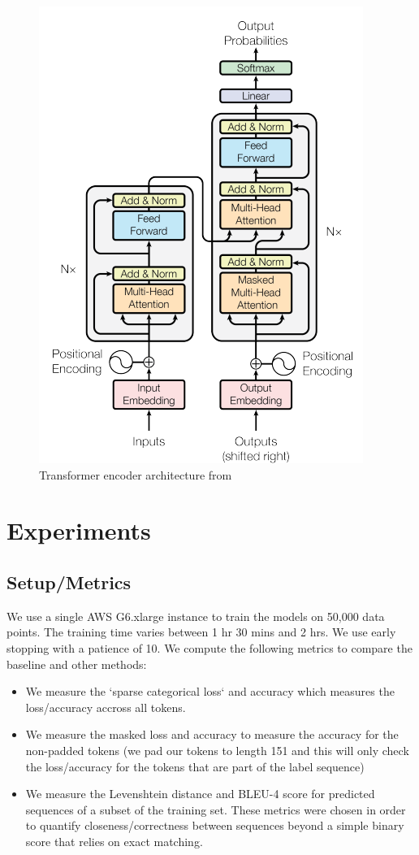 \documentclass{article}
\begin{document}
\begin{figure}[H]
	\centering \includegraphics[scale=0.5]{transformer_decoder.png}
	\caption{Transformer encoder architecture from \cite{transformer}}
\end{figure}


\section{Experiments}

\subsection{Setup/Metrics}

We use a single AWS G6.xlarge instance to train the models on 50,000 data points. The training time varies between  1 hr 30 mins and 2 hrs. We use early stopping with a patience of 10. We compute the following metrics to compare the baseline and other methods:

\begin{itemize}
  \item We measure the `sparse categorical loss` and accuracy which measures the loss/accuracy accross all tokens. 
  \item We measure the masked loss and accuracy to measure the accuracy for the non-padded tokens (we pad our tokens to length 151 and this will only check the loss/accuracy for the tokens that are part of the label sequence)
  \item We measure the Levenshtein distance and BLEU-4 score for predicted sequences of a subset of the training set. These metrics were chosen in order to quantify closeness/correctness between sequences beyond a simple binary score that relies on exact matching.
\end{itemize}
\end{document}
